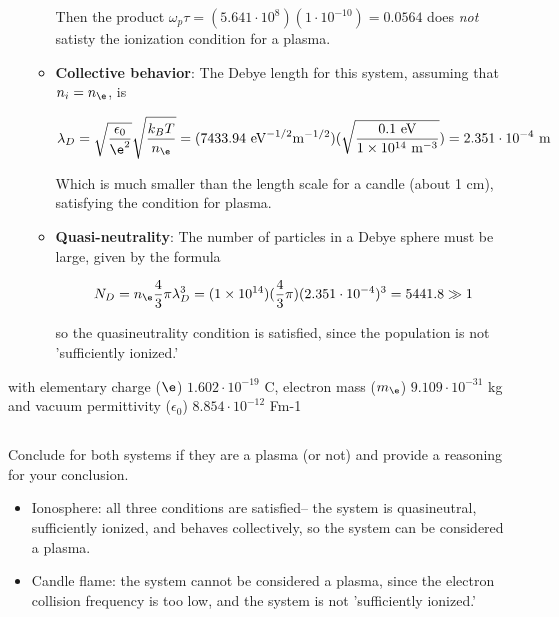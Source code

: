 \documentclass{template}
\begin{document}
\begin{itemize}
\begin{itemize}
        Then the product $\omega_p \tau = (5.641\cdot 10^8)(1\cdot 10^{-10}) = 0.0564$ does \textit{not} satisty the ionization condition for a plasma.
        \item \textbf{Collective behavior}: The Debye length for this system, assuming that $n_i = n_\e$, is

        \begin{equation}
            \lambda_D = \sqrt{\frac{\epsilon_0}{\e^2}}\sqrt{\frac{k_B T}{n_\e}} = ( 7433.94\text{ eV}^{-1/2}\text{m}^{-1/2})(\sqrt{\frac{0.1\text{ eV}}{1\times10^{14}\text{ m}^{-3}}}) = 2.351 \cdot 10^{-4}\text{ m}
        \end{equation}

        Which is much smaller than the length scale for a candle (about 1 cm), satisfying the condition for plasma.

        \item \textbf{Quasi-neutrality}: The number of particles in a Debye sphere must be large, given by the formula
        
        \begin{equation}
            N_D = n_\e \frac{4}{3}\pi \lambda_D^3 = (1\times 10^{14})(\frac{4}{3}\pi)( 2.351 \cdot 10^{-4})^3 = 5441.8 \gg 1
        \end{equation}

        so the quasineutrality condition is satisfied, since the population is not 'sufficiently ionized.'
    \end{itemize}
\end{itemize}



with elementary charge ($\e$) $1.602\cdot10^{-19}$ C, electron mass ($m_\e$) $9.109\cdot10^{-31}$ kg and vacuum permittivity ($\epsilon_0$) $8.854 \cdot 10^{-12}$ Fm-1

\subsection{}

Conclude for both systems if they are a plasma (or not) and provide a reasoning for your conclusion.

\begin{itemize}
    \item Ionosphere: all three conditions are satisfied-- the system is quasineutral, sufficiently ionized, and behaves collectively, so the system can be considered a plasma.
    \item Candle flame: the system cannot be considered a plasma, since the electron collision frequency is too low, and the system is not 'sufficiently ionized.'
\end{itemize}
\end{document}
